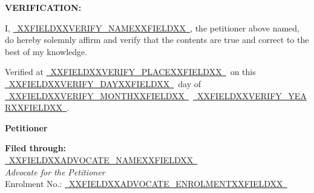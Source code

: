 \documentclass[12pt,a4paper]{article}
\newcommand{\fillline}[1]{\underline{~#1~}}
\begin{document}
\vspace{20pt}

\textbf{VERIFICATION:}

I, \fillline{XXFIELDXXVERIFY_NAMEXXFIELDXX}, the petitioner above named, do hereby solemnly affirm
and verify that the contents are true and correct to the best of my knowledge.

\vspace{8pt}
Verified at \fillline{XXFIELDXXVERIFY_PLACEXXFIELDXX}\ on this \fillline{XXFIELDXXVERIFY_DAYXXFIELDXX}\ day of
\fillline{XXFIELDXXVERIFY_MONTHXXFIELDXX}\ \fillline{XXFIELDXXVERIFY_YEARXXFIELDXX}.

\vspace{18pt}
\hfill\textbf{Petitioner}

\vspace{20pt}

\textbf{Filed through:}\\[6pt]
\fillline{XXFIELDXXADVOCATE_NAMEXXFIELDXX}\\
\textit{Advocate for the Petitioner}\\[4pt]
Enrolment No.: \fillline{XXFIELDXXADVOCATE_ENROLMENTXXFIELDXX}
\end{document}
